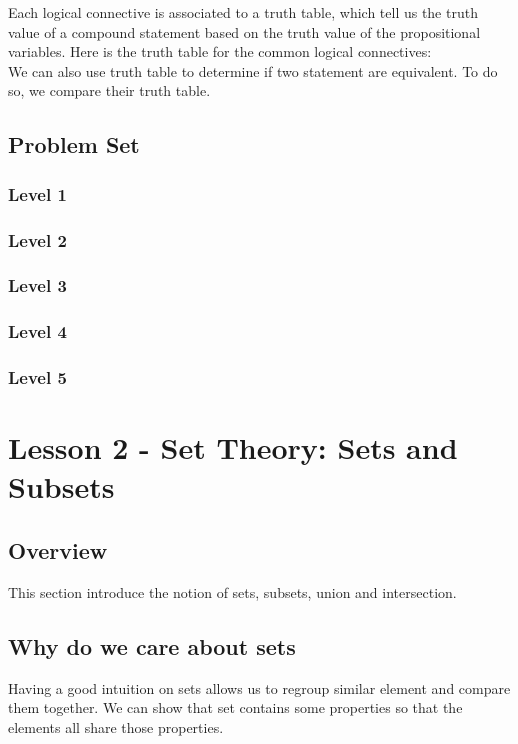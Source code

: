 \documentclass{article}
\begin{document}
\par
Each logical connective is associated to a truth table, which tell us the
truth value of a compound statement based on the truth value of the propositional
variables. Here is the truth table for the common logical connectives:\\

We can also use truth table to determine if two statement are equivalent. To do
so, we compare their truth table.

\subsection{Problem Set}
\subsubsection{Level 1}
\subsubsection{Level 2}
\subsubsection{Level 3}
\subsubsection{Level 4}
\subsubsection{Level 5}
\pagebreak

\section{Lesson 2 - Set Theory: Sets and Subsets}

\subsection{Overview}

This section introduce the notion of sets, subsets, union and intersection.

\subsection{Why do we care about sets}

Having a good intuition on sets allows us to regroup similar element and compare
them together. We can show that set contains some properties so that the elements
all share those properties.
\end{document}
